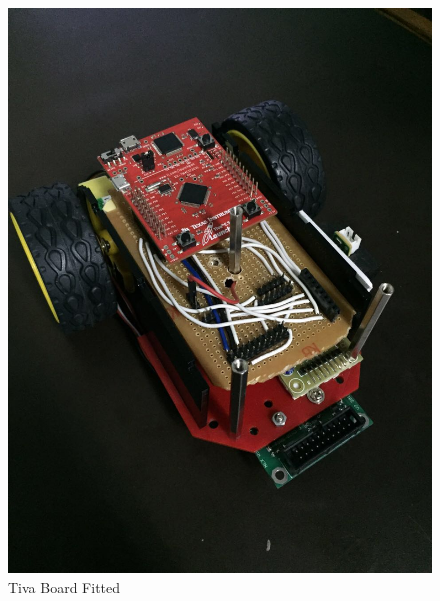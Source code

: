 \documentclass[a4paper,12pt,oneside]{book}
\begin{document}
\begin{enumerate}
\begin{figure}[h]
		\includegraphics[scale=0.13]{Tiva_attatched}
		\caption{Tiva Board Fitted}
	\end{figure}
	\newpage
	

\end{enumerate}
\end{document}
